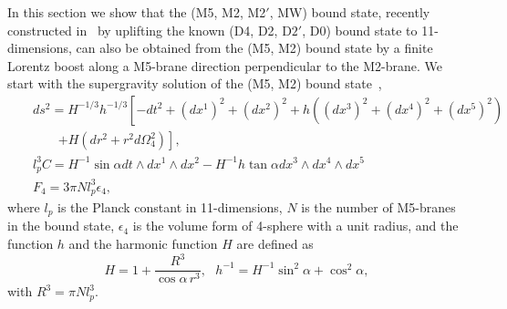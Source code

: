 \documentclass[a4paper,12pt]{article}
\begin{document}
In this section we show that the (M5, M2, M2$'$, MW) bound state, recently
constructed in~\cite{Berg3} by uplifting the known (D4, D2, D$2'$, D0)
bound state to 11-dimensions, can also be obtained from the (M5, M2)
bound state by a finite Lorentz boost
along a M5-brane direction perpendicular to the M2-brane.
We start with the supergravity solution of the (M5, M2) 
bound state~\cite{Town}, 
\begin{eqnarray}
\label{eq1}
&& ds^2 = H^{-1/3}h^{-1/3}\left[-dt^2 + (dx^1)^2 + (dx^2)^2 + 
    h\left((dx^3)^2 + (dx^4)^2 + (dx^5)^2\right)\right.\nonumber\\
&&~~~~~~~~~\left. +H(dr^2 +r^2d\Omega^2_4)\right], \nonumber\\
&& l_p^3 C = H^{-1} \sin\alpha dt\wedge dx^1 \wedge dx^2 -H^{-1}h
   \tan\alpha dx^3 \wedge dx^4 \wedge dx^5\nonumber\\
&& F_4 =  3\pi N l_p^3\epsilon_4,
\end{eqnarray}
where $l_p$ is the Planck constant in 11-dimensions, $N$ is the number of
M5-branes in the bound state, $\epsilon_4$ is the volume form of
4-sphere with a unit radius, and the function $h$ and the harmonic
function $H$ are  defined as 
\begin{equation}
\label{eq2}
H=1+\frac{R^3}{\cos\alpha\, r^3}, \ \ \ h^{-1} =H^{-1}\sin^2\alpha
  +\cos^2\alpha,
\end{equation}
with $R^3 = \pi N l_p^3$. 
 
\end{document}
